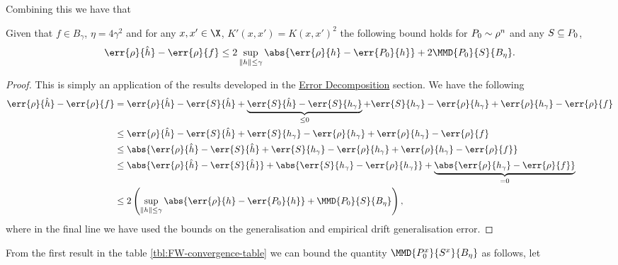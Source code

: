 Combining this we have that
\begin{theorem}
  \label{thm:al-non-generalisation-bound}
  Given that \(f \in B_{\gamma}\), \(\eta = 4\gamma^{2}\) and for any \(x, x' \in
  \X\), \(K'(x, x') = K(x, x')^2\) the following bound holds for \(P_{0} \sim \rho^{n}\) and any \(S \subseteq P_0\),
  \begin{equation*}
    \label{eq:al-non-generalisation-bound}
    \err{\rho}{\hat{h}} - \err{\rho}{f} \leq 2\sup_{\|h\| \leq \gamma}\abs{\err{\rho}{h} - \err{\poolset_0}{h}} + 2 \MMD{\poolset_0}{\trainset}{B_\eta}.
  \end{equation*}
\end{theorem}

\begin{proof}
  This is simply an application of the results developed in the
  \hyperref[sec:error-decomposition]{Error Decomposition} section. We have the following
  \begin{align*}
    \err{\rho}{\hat{h}} - \err{\rho}{f} & = \err{\rho}{\hat{h}} - \err{\trainset}{\hat{h}} + \underbrace{\err{\trainset}{\hat{h}} - \err{\trainset}{h_{\gamma}}}_{\leq 0} + \err{\trainset}{h_{\gamma}} - \err{\rho}{h_{\gamma}} + \err{\rho}{h_{\gamma}} - \err{\rho}{f} \\ 
                                        & \leq \err{\rho}{\hat{h}} - \err{\trainset}{\hat{h}} + \err{\trainset}{h_{\gamma}} - \err{\rho}{h_{\gamma}} + \err{\rho}{h_{\gamma}} - \err{\rho}{f} \\
                                        & \leq \abs{\err{\rho}{\hat{h}} - \err{\trainset}{\hat{h}} + \err{\trainset}{h_{\gamma}} - \err{\rho}{h_{\gamma}} + \err{\rho}{h_{\gamma}} - \err{\rho}{f}} \\
                                        & \leq \abs{\err{\rho}{\hat{h}} - \err{\trainset}{\hat{h}}} + \abs{\err{\trainset}{h_{\gamma}} - \err{\rho}{h_{\gamma}}} + \underbrace{\abs{\err{\rho}{h_{\gamma}} - \err{\rho}{f}}}_{= 0} \\
                                        & \leq 2 \left( \sup_{\|h\| \leq \gamma}\abs{\err{\rho}{h} - \err{\poolset_0}{h}} + \MMD{\poolset_0}{\trainset}{B_\eta} \right),
  \end{align*}
  where in the final line we have used the bounds on the generalisation and empirical drift generalisation error.
\end{proof}
From the first result in the table \ref{tbl:FW-convergence-table} we can bound the
quantity \(\MMD{\poolsetx_{0}}{\trainsetx}{B_{\eta}}\) as follows, let
